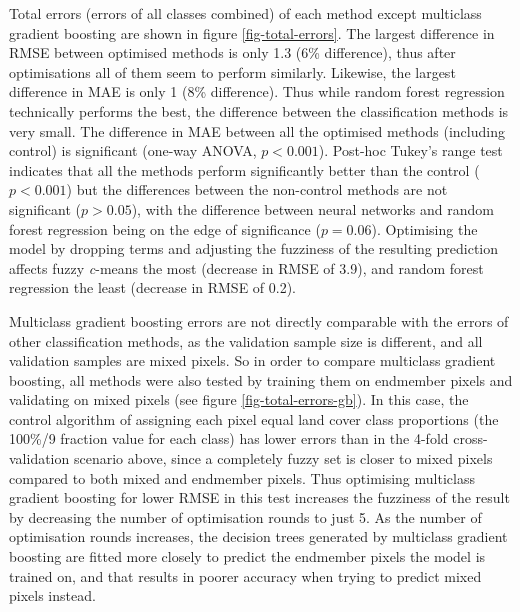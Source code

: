 \documentclass[a4paper,12pt]{scrbook}
\begin{document}
Total errors (errors of all classes combined) of each method except multiclass gradient boosting are shown in figure \ref{fig-total-errors}. The largest difference in RMSE between optimised methods is only 1.3 (6\% difference), thus after optimisations all of them seem to perform similarly. Likewise, the largest difference in MAE is only 1 (8\% difference). Thus while random forest regression technically performs the best, the difference between the classification methods is very small. The difference in MAE between all the optimised methods (including control) is significant (one-way ANOVA, $p<0.001$). Post-hoc Tukey's range test indicates that all the methods perform significantly better than the control ($p<0.001$) but the differences between the non-control methods are not significant ($p>0.05$), with the difference between neural networks and random forest regression being on the edge of significance ($p=0.06$). Optimising the model by dropping terms and adjusting the fuzziness of the resulting prediction affects fuzzy \textit{c}-means the most (decrease in RMSE of 3.9), and random forest regression the least (decrease in RMSE of 0.2).

Multiclass gradient boosting errors are not directly comparable with the errors of other classification methods, as the validation sample size is different, and all validation samples are mixed pixels. So in order to compare multiclass gradient boosting, all methods were also tested by training them on endmember pixels and validating on mixed pixels (see figure \ref{fig-total-errors-gb}). In this case, the control algorithm of assigning each pixel equal land cover class proportions (the 100\%/9 fraction value for each class) has lower errors than in the 4-fold cross-validation scenario above, since a completely fuzzy set is closer to mixed pixels compared to both mixed and endmember pixels. Thus optimising multiclass gradient boosting for lower RMSE in this test increases the fuzziness of the result by decreasing the number of optimisation rounds to just 5. As the number of optimisation rounds increases, the decision trees generated by multiclass gradient boosting are fitted more closely to predict the endmember pixels the model is trained on, and that results in poorer accuracy when trying to predict mixed pixels instead.
\end{document}
